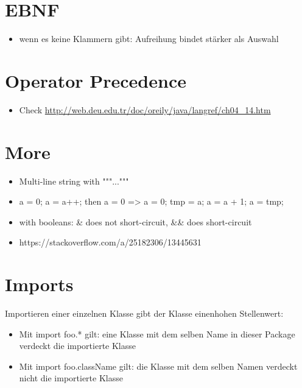 \documentclass[UTF8]{article}
\begin{document}
\section{EBNF}

\begin{itemize}
    \item wenn es keine Klammern gibt: Aufreihung bindet stärker als Auswahl
\end{itemize}

\section{Operator Precedence}

\begin{itemize}
    \item Check \url{http://web.deu.edu.tr/doc/oreily/java/langref/ch04_14.htm}
\end{itemize}

\section{More}

\begin{itemize}
    \item Multi-line string with """..."""
    \item a = 0; a = a++; then a = 0 => a = 0; tmp = a; a = a + 1; a = tmp;
    \item with booleans: \& does not short-circuit, \&\& does short-circuit
    \item https://stackoverflow.com/a/25182306/13445631
\end{itemize}

\section{Imports}

Importieren einer einzelnen Klasse gibt der Klasse einenhohen Stellenwert:

\begin{itemize}
    \item Mit import foo.* gilt: eine Klasse mit dem selben Name in dieser Package verdeckt die importierte Klasse
    \item Mit import foo.className gilt: die Klasse mit dem selben Namen verdeckt nicht die importierte Klasse
\end{itemize}
\end{document}
